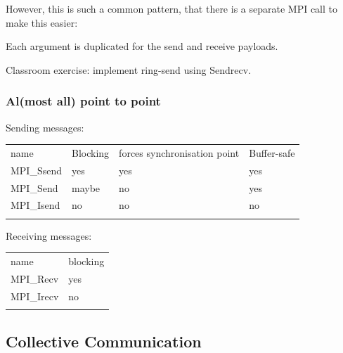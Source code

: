 However, this is such a common pattern, that there is a separate MPI
call to make this easier:

\begin{Shaded}
\begin{Highlighting}[]
     
                     
\end{Highlighting}
\end{Shaded}

Each argument is duplicated for the send and receive payloads.

Classroom exercise: implement ring-send using Sendrecv.

\subsubsection{Al(most all) point to
point}\label{almost-all-point-to-point}

Sending messages:

\begin{longtable}[c]{@{}llll@{}}
\toprule\addlinespace
name & Blocking & forces synchronisation point & Buffer-safe
\\\addlinespace
\midrule\endhead
MPI\_Ssend & yes & yes & yes
\\\addlinespace
MPI\_Send & maybe & no & yes
\\\addlinespace
MPI\_Isend & no & no & no
\\\addlinespace
\bottomrule
\end{longtable}

Receiving messages:

\begin{longtable}[c]{@{}ll@{}}
\toprule\addlinespace
name & blocking
\\\addlinespace
\midrule\endhead
MPI\_Recv & yes
\\\addlinespace
MPI\_Irecv & no
\\\addlinespace
\bottomrule
\end{longtable}

\subsection{Collective Communication}\label{collective-communication}

